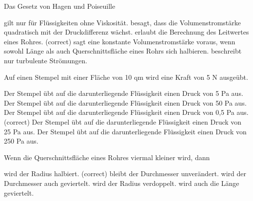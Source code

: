 \documentclass[11pt]{exam}
\begin{document}
\setlength{\voffset}{-0.5in}
\setlength{\headsep}{5pt}

\hspace{2mm}
 \hspace{5mm}
\vspace{4mm}

\begin{questions}

\question Das Gesetz von Hagen und Poiseuille

\begin{choices}
	\choice gilt nur für Flüssigkeiten ohne Viskosität.
	\choice besagt, dass die Volumenstromstärke quadratisch mit der Druckdifferenz wächst.
	\choice erlaubt die Berechnung des Leitwertes eines Rohres. (correct)
	\choice sagt eine konstante Volumenstromstärke voraus, wenn sowohl Länge als auch Querschnittsfläche eines Rohrs sich halbieren.
	\choice beschreibt nur turbulente Strömungen.
\end{choices}

\vspace{3mm}\question Auf einen Stempel mit einer Fläche von 10 qm wird eine Kraft von 5 N ausgeübt.

\begin{choices}
	\choice Der Stempel übt auf die darunterliegende Flüssigkeit einen Druck von 5 Pa aus.
	\choice Der Stempel übt auf die darunterliegende Flüssigkeit einen Druck von 50 Pa aus.
	\choice Der Stempel übt auf die darunterliegende Flüssigkeit einen Druck von 0,5 Pa aus. (correct)
	\choice Der Stempel übt auf die darunterliegende Flüssigkeit einen Druck von 25 Pa aus.
	\choice Der Stempel übt auf die darunterliegende Flüssigkeit einen Druck von 250 Pa aus.
\end{choices}

\vspace{3mm}\question Wenn die Querschnittsfläche eines Rohres viermal kleiner wird, dann

\begin{choices}
	\choice wird der Radius halbiert. (correct)
	\choice bleibt der Durchmesser unverändert.
	\choice wird der Durchmesser auch geviertelt.
	\choice wird der Radius verdoppelt.
	\choice wird auch die Länge geviertelt.
\end{choices}


\end{questions}
\end{document}
